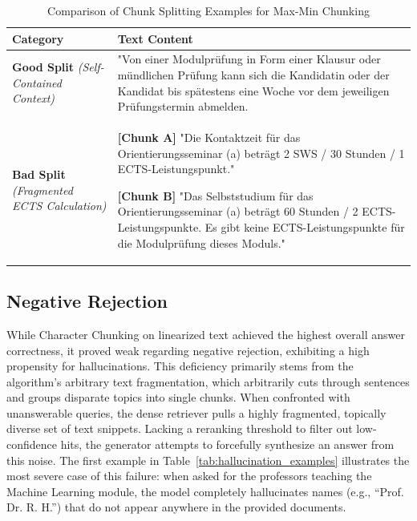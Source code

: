 \documentclass[12pt]{article} %
\begin{document}
\begin{table}[htbp]
    \centering
    \caption{Comparison of Chunk Splitting Examples for Max-Min Chunking}
    \label{tab:chunk_comparison_maxmin}
    \begin{tabular}{@{} p{} p{} @{}}
        \toprule
        \textbf{Category}                                                  & \textbf{Text Content}                                                                                             \\
        \midrule
        \textbf{Good Split} \newline \textit{(Self-Contained Context)}     &
        "Von einer Modulprüfung in Form einer Klausur oder mündlichen Prüfung kann sich die Kandidatin oder der Kandidat bis spätestens eine Woche vor dem jeweiligen Prüfungstermin abmelden. \\
        \midrule
        \textbf{Bad Split} \newline \textit{(Fragmented ECTS Calculation)} &
        \textbf{[Chunk A]} \newline
        "Die Kontaktzeit für das Orientierungsseminar (a) beträgt 2 SWS / 30 Stunden / 1 ECTS-Leistungspunkt." \par\medskip
        \textbf{[Chunk B]} \newline
        "Das Selbststudium für das Orientierungsseminar (a) beträgt 60 Stunden / 2 ECTS-Leistungspunkte. Es gibt keine ECTS-Leistungspunkte für die Modulprüfung dieses Moduls."               \\
        \bottomrule
    \end{tabular}
\end{table}
\FloatBarrier
\subsection{Negative Rejection}

While Character Chunking on linearized text achieved the highest overall answer correctness, it proved weak regarding negative rejection, exhibiting a high propensity for hallucinations. This deficiency primarily stems from the algorithm's arbitrary text fragmentation, which arbitrarily cuts through sentences and groups disparate topics into single chunks. When confronted with unanswerable queries, the dense retriever pulls a highly fragmented, topically diverse set of text snippets. Lacking a reranking threshold to filter out low-confidence hits, the generator attempts to forcefully synthesize an answer from this noise. The first example in Table~\ref{tab:hallucination_examples} illustrates the most severe case of this failure: when asked for the professors teaching the Machine Learning module, the model completely hallucinates names (e.g., ``Prof. Dr. R. H.'') that do not appear anywhere in the provided documents.
\end{document}
